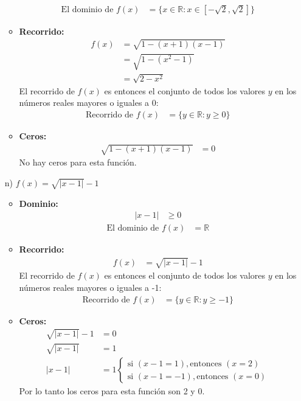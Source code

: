 \documentclass{templateNote}
\begin{document}
\begin{itemize}
\begin{itemize}
\begin{align*}
        \end{align*}
        \begin{align*}
            \text{El dominio de } f(x) &= \{x \in \mathbb{R} : x \in [-\sqrt{2}, \sqrt{2}]\}
        \end{align*}
        \item \textbf{Recorrido:}
        \begin{align*}
            f(x) &= \sqrt{1 - (x + 1)(x - 1)} \\
            &= \sqrt{1 - (x^2 - 1)} \\
            &= \sqrt{2 - x^2}
        \end{align*}
        El recorrido de \( f(x) \) es entonces el conjunto de todos los valores \( y \) en los números reales mayores o iguales a 0:
        \begin{align*}
            \text{Recorrido de } f(x) &= \{y \in \mathbb{R} : y \geq 0\}
        \end{align*}
        \item \textbf{Ceros:}
        \begin{align*}
            \sqrt{1 - (x + 1)(x - 1)} &= 0
        \end{align*}
        No hay ceros para esta función.
    \end{itemize}
    \item[n)] $f(x) = \sqrt{|x - 1|} - 1$
    \begin{itemize}
        \item \textbf{Dominio:}
        \begin{align*}
            |x - 1| &\geq 0
        \end{align*}
        \begin{align*}
            \text{El dominio de } f(x) &= \mathbb{R}
        \end{align*}
        \item \textbf{Recorrido:}
        \begin{align*}
            f(x) &= \sqrt{|x - 1|} - 1
        \end{align*}
        El recorrido de \( f(x) \) es entonces el conjunto de todos los valores \( y \) en los números reales mayores o iguales a -1:
        \begin{align*}
            \text{Recorrido de } f(x) &= \{y \in \mathbb{R} : y \geq -1\}
        \end{align*}
        \item \textbf{Ceros:}
        \begin{align*}
            \sqrt{|x - 1|} - 1 &= 0 \\
            \sqrt{|x - 1|} &= 1 \\
            |x - 1| &= 1 
            \begin{cases} \text{si } (x-1=1), \text{entonces } (x=2) \\ \text{si } (x-1=-1), \text{entonces } (x=0)\end{cases}
        \end{align*}
        Por lo tanto los ceros para esta función son 2 y 0.
    \end{itemize}
\end{itemize}
\end{document}
